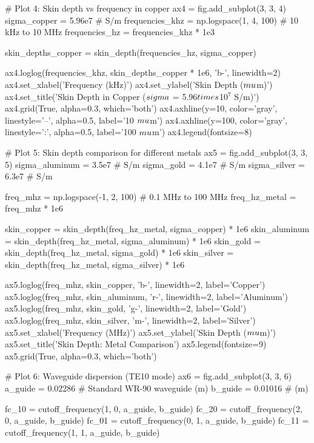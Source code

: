 \documentclass[a4paper, 11pt]{article}
\begin{document}
\begin{pycode}
# Plot 4: Skin depth vs frequency in copper
ax4 = fig.add_subplot(3, 3, 4)
sigma_copper = 5.96e7  # S/m
frequencies_khz = np.logspace(1, 4, 100)  # 10 kHz to 10 MHz
frequencies_hz = frequencies_khz * 1e3

skin_depths_copper = skin_depth(frequencies_hz, sigma_copper)

ax4.loglog(frequencies_khz, skin_depths_copper * 1e6, 'b-', linewidth=2)
ax4.set_xlabel('Frequency (kHz)')
ax4.set_ylabel('Skin Depth ($\\mu$m)')
ax4.set_title('Skin Depth in Copper ($\\sigma$ = 5.96$\\times$10$^7$ S/m)')
ax4.grid(True, alpha=0.3, which='both')
ax4.axhline(y=10, color='gray', linestyle='--', alpha=0.5, label='10 $\\mu$m')
ax4.axhline(y=100, color='gray', linestyle=':', alpha=0.5, label='100 $\\mu$m')
ax4.legend(fontsize=8)

# Plot 5: Skin depth comparison for different metals
ax5 = fig.add_subplot(3, 3, 5)
sigma_aluminum = 3.5e7  # S/m
sigma_gold = 4.1e7  # S/m
sigma_silver = 6.3e7  # S/m

freq_mhz = np.logspace(-1, 2, 100)  # 0.1 MHz to 100 MHz
freq_hz_metal = freq_mhz * 1e6

skin_copper = skin_depth(freq_hz_metal, sigma_copper) * 1e6
skin_aluminum = skin_depth(freq_hz_metal, sigma_aluminum) * 1e6
skin_gold = skin_depth(freq_hz_metal, sigma_gold) * 1e6
skin_silver = skin_depth(freq_hz_metal, sigma_silver) * 1e6

ax5.loglog(freq_mhz, skin_copper, 'b-', linewidth=2, label='Copper')
ax5.loglog(freq_mhz, skin_aluminum, 'r-', linewidth=2, label='Aluminum')
ax5.loglog(freq_mhz, skin_gold, 'g-', linewidth=2, label='Gold')
ax5.loglog(freq_mhz, skin_silver, 'm-', linewidth=2, label='Silver')
ax5.set_xlabel('Frequency (MHz)')
ax5.set_ylabel('Skin Depth ($\\mu$m)')
ax5.set_title('Skin Depth: Metal Comparison')
ax5.legend(fontsize=9)
ax5.grid(True, alpha=0.3, which='both')

# Plot 6: Waveguide dispersion (TE10 mode)
ax6 = fig.add_subplot(3, 3, 6)
a_guide = 0.02286  # Standard WR-90 waveguide (m)
b_guide = 0.01016  # (m)

fc_10 = cutoff_frequency(1, 0, a_guide, b_guide)
fc_20 = cutoff_frequency(2, 0, a_guide, b_guide)
fc_01 = cutoff_frequency(0, 1, a_guide, b_guide)
fc_11 = cutoff_frequency(1, 1, a_guide, b_guide)


\end{pycode}
\end{document}
